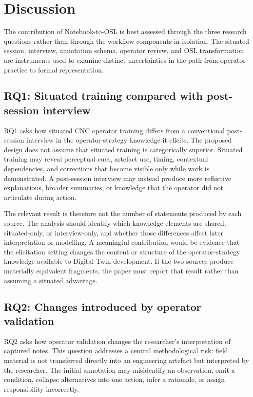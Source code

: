 \section{Discussion}
\label{sec:discussion}

The contribution of Notebook-to-OSL is best assessed through the three research questions rather than through the workflow components in isolation. The situated session, interview, annotation schema, operator review, and OSL transformation are instruments used to examine distinct uncertainties in the path from operator practice to formal representation.

\subsection{RQ1: Situated training compared with post-session interview}

RQ1 asks how situated CNC operator training differs from a conventional post-session interview in the operator-strategy knowledge it elicits. The proposed design does not assume that situated training is categorically superior. Situated training may reveal perceptual cues, artefact use, timing, contextual dependencies, and corrections that become visible only while work is demonstrated. A post-session interview may instead produce more reflective explanations, broader summaries, or knowledge that the operator did not articulate during action.

The relevant result is therefore not the number of statements produced by each source. The analysis should identify which knowledge elements are shared, situated-only, or interview-only, and whether those differences affect later interpretation or modelling. A meaningful contribution would be evidence that the elicitation setting changes the content or structure of the operator-strategy knowledge available to Digital Twin development. If the two sources produce materially equivalent fragments, the paper must report that result rather than assuming a situated advantage.

\subsection{RQ2: Changes introduced by operator validation}

RQ2 asks how operator validation changes the researcher's interpretation of captured notes. This question addresses a central methodological risk: field material is not transferred directly into an engineering artefact but interpreted by the researcher. The initial annotation may misidentify an observation, omit a condition, collapse alternatives into one action, infer a rationale, or assign responsibility incorrectly.

